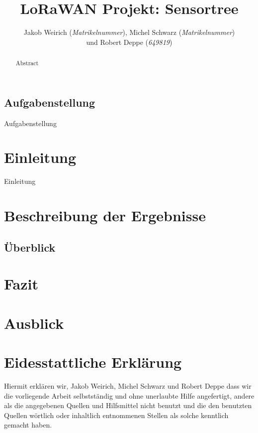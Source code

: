 \documentclass{article}
\title{LoRaWAN Projekt: Sensortree}
\author{Jakob Weirich (\textit{Matrikelnummer}), Michel Schwarz (\textit{Matrikelnummer}) \\und Robert Deppe (\textit{649819})}
\begin{document}
\onehalfspacing
\maketitle
\newpage

\tableofcontents
\newpage

\subsection*{Aufgabenstellung}
Aufgabenstellung

\vfill{}

\begin{abstract}
    Abstract
\end{abstract}

\vfill{}

\newpage

\setcounter{page}{1}

\section{Einleitung}
Einleitung
\newpage

\section{Beschreibung der Ergebnisse}


\subsection{Überblick}

\section{Fazit}

\newpage
\section{Ausblick}

\newpage

\listoffigures
\newpage

\printbibliography
\newpage

\section*{Eidesstattliche Erklärung}
Hiermit erklären wir, Jakob Weirich, Michel Schwarz und Robert Deppe dass wir die vorliegende Arbeit selbstständig und ohne unerlaubte Hilfe angefertigt, andere als die angegebenen Quellen und Hilfsmittel nicht benutzt und die den benutzten Quellen wörtlich oder inhaltlich entnommenen Stellen als solche kenntlich gemacht haben.


\newpage
\end{document}
